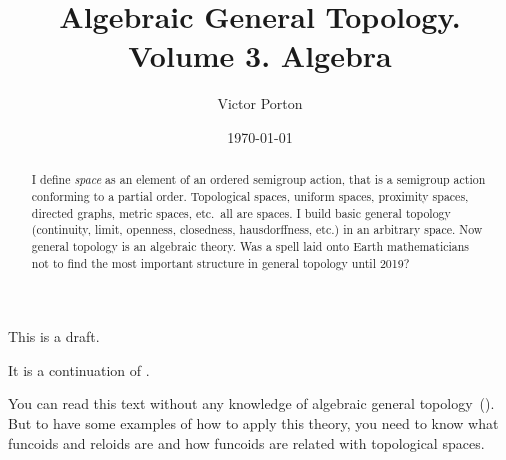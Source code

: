 \documentclass[english,reqno,12pt]{amsbook}
\begin{document}
\title{Algebraic General Topology. Volume 3. Algebra}

\author{Victor Porton}



\date{\today}

\begin{abstract}
I define \emph{space} as an element of an ordered semigroup action, that is a semigroup action conforming to a partial order. Topological spaces, uniform spaces, proximity spaces, directed graphs, metric spaces, etc.\ all are spaces. I build basic general topology (continuity, limit, openness, closedness, hausdorffness, etc.) in an arbitrary space. Now general topology is an algebraic theory. Was a spell laid onto Earth mathematicians not to find the most important structure in general topology until 2019?
\end{abstract}





\maketitle

\tableofcontents{}

This is a draft.

It is a continuation of \cite{volume-1}.

You can read this text without any knowledge of algebraic general topology~(\cite{volume-1}). But to have some examples of how to apply this theory, you need to know what funcoids and reloids are and how funcoids are related with topological spaces.






\end{document}
